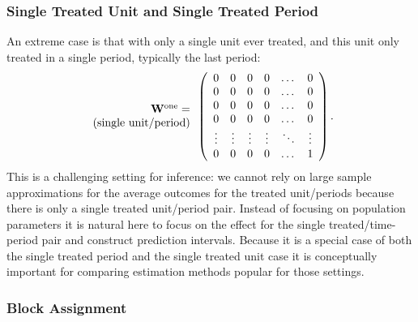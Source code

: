 \documentclass[letterpaper,12pt,leqno]{article}
\newcommand{\ttock}{1}
\newcommand{\ttick}{0}
\newcommand{\bw}{{\bf W}}
\begin{document}
\subsubsection{Single Treated Unit and Single  Treated Period}
An extreme case is that with only a single unit ever treated, and this unit only treated in a single period, typically the last period:
\[
\begin{array}{r}\bw^{\rm one}=\\ 
(\text{single unit/period})
\end{array}\left(
\begin{array}{cccccccc}
	 \ttick &  \ttick & \ttick  & \ttick & \dots & \ttick \\
	\ttick  & \ttick &  \ttick & \ttick   & \dots & \ttick  \\
	 \ttick  & \ttick &  \ttick  & \ttick  & \dots & \ttick  \\
	 \ttick  & \ttick & \ttick &  \ttick   & \dots &\ttick  \\
	\vdots   &  \vdots  &  \vdots& \vdots &\ddots &\vdots \\
	 \ttick  & \ttick &  \ttick   & \ttick & \dots & {{\ttock}}  \\
\end{array}
\right).
\]
This is a challenging setting for inference: we cannot rely on large sample approximations for the average outcomes for the treated unit/periods because there is only a single treated unit/period pair. 
Instead of focusing on population parameters it is natural here to focus on the effect for the single treated/time-period pair and construct prediction intervals.
Because it is a special case of both the single treated period and the single treated unit case it is conceptually important for comparing estimation methods popular for those settings.

\subsubsection{Block Assignment}\label{block}
\end{document}
